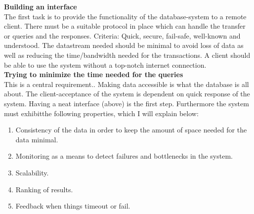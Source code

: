 \documentclass[twoside, 11pt]{scrartcl}
\begin{document}
\textbf{Building an interface}\\
The first task is to provide the functionality of the database-system to a remote client. There must be a suitable protocol in place which can handle the transfer or queries and the responses. Criteria: Quick, secure, fail-safe, well-known and understood. The datastream needed should be minimal to avoid loss of data as well as reducing the time/bandwidth needed for the transactions. A client should be able to use the system without a top-notch internet connection.\\



\textbf{Trying to minimize the time needed for the queries}\\
This is a central requirement.. Making data accessible is what the database is all about. The client-acceptance of the system is dependent on quick response of the system. Having a neat interface (above) is the first step. Furthermore the system must exhibitthe following properties, which I will explain below:
\begin{enumerate}
	\item Consistency of the data in order to keep the amount of space needed for the data minimal.
	\item Monitoring as a means to detect failures and bottlenecks in the system.
	\item Scalability.
	\item Ranking of results.
	\item Feedback when things timeout or fail.
\end{enumerate}
\end{document}

